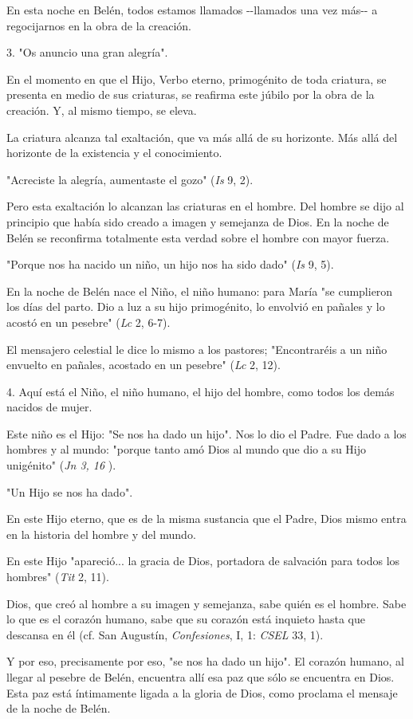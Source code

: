 En esta noche en Belén, todos estamos llamados -\/-llamados una vez
más-\/- a regocijarnos en la obra de la creación.

3. "Os anuncio una gran alegría".

En el momento en que el Hijo, Verbo eterno, primogénito de toda
criatura, se presenta en medio de sus criaturas, se reafirma este júbilo
por la obra de la creación. Y, al mismo tiempo, se eleva.

La criatura alcanza tal exaltación, que va más allá de su horizonte. Más
allá del horizonte de la existencia y el conocimiento.

"Acreciste la alegría, aumentaste el gozo" (\emph{Is} 9, 2).

Pero esta exaltación lo alcanzan las criaturas en el hombre. Del hombre
se dijo al principio que había sido creado a imagen y semejanza de Dios.
En la noche de Belén se reconfirma totalmente esta verdad sobre el
hombre con mayor fuerza.

"Porque nos ha nacido un niño, un hijo nos ha sido dado" (\emph{Is} 9,
5).

En la noche de Belén nace el Niño, el niño humano: para María "se
cumplieron los días del parto. Dio a luz a su hijo primogénito, lo
envolvió en pañales y lo acostó en un pesebre" (\emph{Lc} 2, 6-7).

El mensajero celestial le dice lo mismo a los pastores; "Encontraréis a
un niño envuelto en pañales, acostado en un pesebre" (\emph{Lc} 2, 12).

4. Aquí está el Niño, el niño humano, el hijo del hombre, como todos los
demás nacidos de mujer.

Este niño es el Hijo: "Se nos ha dado un hijo". Nos lo dio el Padre. Fue
dado a los hombres y al mundo: "porque tanto amó Dios al mundo que dio a
su Hijo unigénito" (\emph{Jn 3, 16} ).

"Un Hijo se nos ha dado".

En este Hijo eterno, que es de la misma sustancia que el Padre, Dios
mismo entra en la historia del hombre y del mundo.

En este Hijo "apareció... la gracia de Dios, portadora de salvación para
todos los hombres" (\emph{Tit} 2, 11).

Dios, que creó al hombre a su imagen y semejanza, sabe quién es el
hombre. Sabe lo que es el corazón humano, sabe que su corazón está
inquieto hasta que descansa en él (cf. San Augustín, \emph{Confesiones},
I, 1: \emph{CSEL} 33, 1).

Y por eso, precisamente por eso, "se nos ha dado un hijo". El corazón
humano, al llegar al pesebre de Belén, encuentra allí esa paz que sólo
se encuentra en Dios. Esta paz está íntimamente ligada a la gloria de
Dios, como proclama el mensaje de la noche de Belén.

